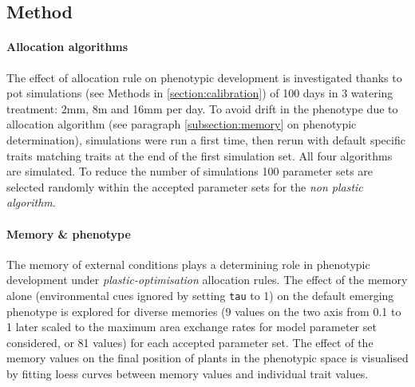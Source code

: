 \subsection{Method}



\paragraph{Allocation algorithms}
The effect of allocation rule on phenotypic development is investigated thanks to pot simulations (see Methods in \ref{section:calibration}) of 100 days in 3 watering treatment: 2mm, 8m and 16mm per day. To avoid drift in the phenotype due to allocation algorithm (see paragraph \ref{subsection:memory} on phenotypic determination), simulations were run a first time, then rerun with default specific traits matching traits at the end of the first simulation set. All four algorithms are simulated. To reduce the number of simulations 100 parameter sets are selected randomly within the accepted parameter sets for the \textit{non plastic algorithm}.

\paragraph{Memory \& phenotype}
The memory of external conditions plays a determining role in phenotypic development under \textit{plastic-optimisation} allocation rules. The effect of the memory alone (environmental cues ignored by setting \texttt{tau} to 1) on the default emerging phenotype is explored for diverse memories (9 values on the two axis from 0.1 to 1 later scaled to the maximum area exchange rates for model parameter set considered, or 81 values) for each accepted parameter set. The effect of the memory values on the final position of plants in the phenotypic space is visualised by fitting loess curves between memory values and individual trait values.

